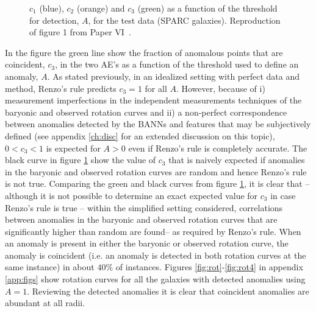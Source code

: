 \begin{example}
\begin{figure}[ht]
		\caption{$c_1$ (blue), $c_2$ (orange) and $c_3$ (green) as a function of the threshold for detection, $A$, for the test data (SPARC galaxies). Reproduction of figure 1 from Paper VI~\cite{Petersen:2020renzo}.}
		\label{fig:res}
	\end{figure}
	In the figure the green line show the fraction of anomalous points that are coincident, $c_3$, in the two AE's as a function of the threshold used to define an anomaly, $A$. As stated previously, in an idealized setting with perfect data and method, Renzo's rule predicts $c_3=1$ for all $A$. However, because of i) measurement imperfections in the independent measurements techniques of the baryonic and observed rotation curves and ii) a non-perfect correspondence between anomalies detected by the BANNs and features that may be subjectively defined (see appendix \ref{ch:disc} for an extended discussion on this topic), $0<c_3<1$ is expected for $A>0$ even if Renzo's rule is completely accurate. The black curve in figure \ref{fig:res} show the value of $c_3$ that is naively expected if anomalies in the baryonic and observed rotation curves are random and hence Renzo's rule is not true. Comparing the green and black curves from figure \ref{fig:res}, it is clear that -- although it is not possible to determine an exact expected value for $c_3$ in case Renzo's rule is true -- within the simplified setting considered, correlations between anomalies in the baryonic and observed rotation curves that are significantly higher than random  are found-- as required by Renzo's rule. When an anomaly is present in either the baryonic or observed rotation curve, the anomaly is coincident (i.e. an anomaly is detected in both rotation curves at the same instance) in about $40\%$ of instances. Figures \ref{fig:rot}-\ref{fig:rot4} in appendix \ref{app:figs} show rotation curves for all the galaxies with detected anomalies using $A=1$. Reviewing the detected anomalies it is clear that coincident anomalies are abundant at all radii.
	
	
\end{example}